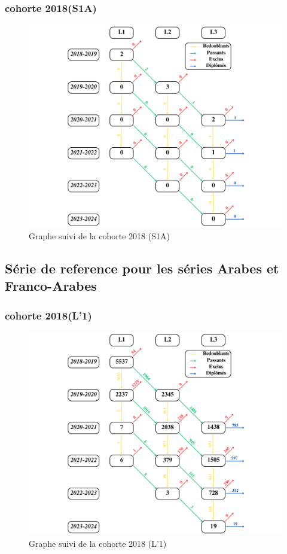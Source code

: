 \newpage
\subsubsection{cohorte 2018(S1A)}

\begin{figure}[ht]
    \centering
    \caption{Graphe suivi de la cohorte 2018 (S1A)}
    \includegraphics[width=1\textwidth]{figure/S1A_2018.png}
\end{figure}

\newpage
\subsection{Série de reference pour les séries Arabes et Franco-Arabes}

\subsubsection{cohorte 2018(L'1)}

\begin{figure}[ht]
    \centering
    \caption{Graphe suivi de la cohorte 2018 (L'1)}
    \includegraphics[width=1\textwidth]{figure/L1_2018.png}
\end{figure}

